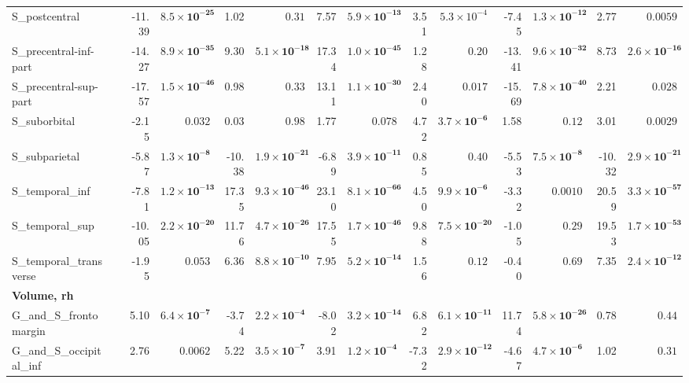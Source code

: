 {\begin{longtable}{llrrrrrrrrrrrr}
S\_postcentral &  & -11.39 & $\mathbf{8.5{\times}10^{-25}}$ & 1.02 & $0.31$ & 7.57 & $\mathbf{5.9{\times}10^{-13}}$ & 3.51 & $5.3{\times}10^{-4}$ & -7.45 & $\mathbf{1.3{\times}10^{-12}}$ & 2.77 & $0.0059$ \\
S\_precentral-inf-part &  & -14.27 & $\mathbf{8.9{\times}10^{-35}}$ & 9.30 & $\mathbf{5.1{\times}10^{-18}}$ & 17.34 & $\mathbf{1.0{\times}10^{-45}}$ & 1.28 & $0.20$ & -13.41 & $\mathbf{9.6{\times}10^{-32}}$ & 8.73 & $\mathbf{2.6{\times}10^{-16}}$ \\
S\_precentral-sup-part &  & -17.57 & $\mathbf{1.5{\times}10^{-46}}$ & 0.98 & $0.33$ & 13.11 & $\mathbf{1.1{\times}10^{-30}}$ & 2.40 & $0.017$ & -15.69 & $\mathbf{7.8{\times}10^{-40}}$ & 2.21 & $0.028$ \\
S\_suborbital &  & -2.15 & $0.032$ & 0.03 & $0.98$ & 1.77 & $0.078$ & 4.72 & $\mathbf{3.7{\times}10^{-6}}$ & 1.58 & $0.12$ & 3.01 & $0.0029$ \\
S\_subparietal &  & -5.87 & $\mathbf{1.3{\times}10^{-8}}$ & -10.38 & $\mathbf{1.9{\times}10^{-21}}$ & -6.89 & $\mathbf{3.9{\times}10^{-11}}$ & 0.85 & $0.40$ & -5.53 & $\mathbf{7.5{\times}10^{-8}}$ & -10.32 & $\mathbf{2.9{\times}10^{-21}}$ \\
S\_temporal\_inf &  & -7.81 & $\mathbf{1.2{\times}10^{-13}}$ & 17.35 & $\mathbf{9.3{\times}10^{-46}}$ & 23.10 & $\mathbf{8.1{\times}10^{-66}}$ & 4.50 & $\mathbf{9.9{\times}10^{-6}}$ & -3.32 & $0.0010$ & 20.59 & $\mathbf{3.3{\times}10^{-57}}$ \\
S\_temporal\_sup &  & -10.05 & $\mathbf{2.2{\times}10^{-20}}$ & 11.76 & $\mathbf{4.7{\times}10^{-26}}$ & 17.55 & $\mathbf{1.7{\times}10^{-46}}$ & 9.88 & $\mathbf{7.5{\times}10^{-20}}$ & -1.05 & $0.29$ & 19.53 & $\mathbf{1.7{\times}10^{-53}}$ \\
S\_temporal\_transverse &  & -1.95 & $0.053$ & 6.36 & $\mathbf{8.8{\times}10^{-10}}$ & 7.95 & $\mathbf{5.2{\times}10^{-14}}$ & 1.56 & $0.12$ & -0.40 & $0.69$ & 7.35 & $\mathbf{2.4{\times}10^{-12}}$ \\
\midrule\multicolumn{14}{l}{\textbf{Volume, rh}} \\
G\_and\_S\_frontomargin &  & 5.10 & $\mathbf{6.4{\times}10^{-7}}$ & -3.74 & $\mathbf{2.2{\times}10^{-4}}$ & -8.02 & $\mathbf{3.2{\times}10^{-14}}$ & 6.82 & $\mathbf{6.1{\times}10^{-11}}$ & 11.74 & $\mathbf{5.8{\times}10^{-26}}$ & 0.78 & $0.44$ \\
G\_and\_S\_occipital\_inf &  & 2.76 & $0.0062$ & 5.22 & $\mathbf{3.5{\times}10^{-7}}$ & 3.91 & $\mathbf{1.2{\times}10^{-4}}$ & -7.32 & $\mathbf{2.9{\times}10^{-12}}$ & -4.67 & $\mathbf{4.7{\times}10^{-6}}$ & 1.02 & $0.31$ \\

\end{longtable}}
